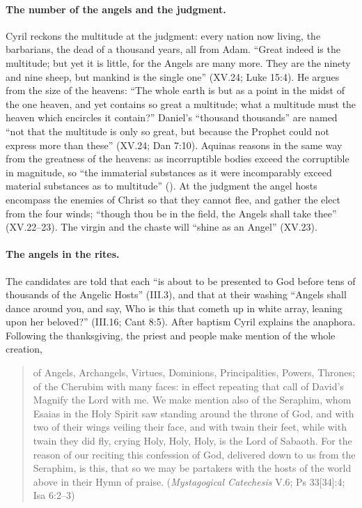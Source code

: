 \paragraph{The number of the angels and the judgment.} Cyril reckons the
multitude at the judgment: every nation now living, the barbarians, the
dead of a thousand years, all from Adam. ``Great indeed is the
multitude; but yet it is little, for the Angels are many more. They are
the ninety and nine sheep, but mankind is the single one'' (XV.24; Luke
15:4). He argues from the size of the heavens: ``The whole earth is but
as a point in the midst of the one heaven, and yet contains so great a
multitude; what a multitude must the heaven which encircles it contain?''
Daniel's ``thousand thousands'' are named ``not that the multitude is
only so great, but because the Prophet could not express more than
these'' (XV.24; Dan 7:10). Aquinas reasons in the same way from the
greatness of the heavens: as incorruptible bodies exceed the corruptible
in magnitude, so ``the immaterial substances as it were incomparably exceed
material substances as to multitude'' (). At the
judgment the angel hosts encompass the
enemies of Christ so that they cannot flee, and gather the elect from the
four winds; ``though thou be in the field, the Angels shall take thee''
(XV.22--23). The virgin and the chaste will ``shine as an Angel''
(XV.23).

\paragraph{The angels in the rites.} The candidates are told that each
``is about to be presented to God before tens of thousands of the
Angelic Hosts'' (III.3), and that at their washing ``Angels shall dance
around you, and say, Who is this that cometh up in white array, leaning
upon her beloved?'' (III.16; Cant 8:5). After baptism Cyril explains the
anaphora. Following the thanksgiving, the priest and people make
mention of the whole creation,

\begin{quote}
of Angels, Archangels, Virtues, Dominions, Principalities, Powers,
Thrones; of the Cherubim with many faces: in effect repeating that call
of David's Magnify the Lord with me. We make mention also of the
Seraphim, whom Esaias in the Holy Spirit saw standing around the throne
of God, and with two of their wings veiling their face, and with twain
their feet, while with twain they did fly, crying Holy, Holy, Holy, is
the Lord of Sabaoth. For the reason of our reciting this confession of
God, delivered down to us from the Seraphim, is this, that so we may be
partakers with the hosts of the world above in their Hymn of praise.
(\emph{Mystagogical Catechesis} V.6; Ps 33[34]:4; Isa 6:2--3)
\end{quote}

